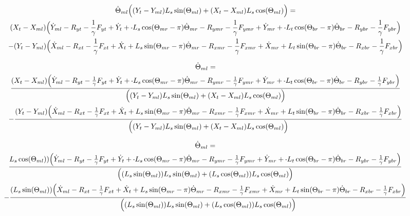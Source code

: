 \documentclass[11pt, landscape]{article}
\newcommand{\mn}{\scalebox{0.7}[1.0]{-}}
\begin{document}
\begin{multline}
\dot{\Theta}_{ml} \Big((Y_{t } - Y_{ml})L_{s}\sin(\Theta_{ml}) + (X_{t } - X_{ml})L_{s}\cos(\Theta_{ml}) \Big) = \\
(X_{t } - X_{ml}) \Big( \dot{Y}_{ml} - R_{yt} - \frac{1}{\gamma}F_{yt } + \dot{Y}_{t } + \mn L_{s}\cos(\Theta_{mr}-\pi)  \dot{\Theta}_{mr}
- R_{ymr} - \frac{1}{\gamma}F_{ymr} + \dot{Y}_{mr} + \mn L_{t}\cos(\Theta_{br}-\pi)  \dot{\Theta}_{br} - R_{ybr} - \frac{1}{\gamma}F_{ybr}\Big) \\
- (Y_{t } - Y_{ml})\Big( \dot{X}_{ml} - R_{xt } - \frac{1}{\gamma}F_{xt } + \dot{X}_{t } + L_{s}\sin(\Theta_{mr}-\pi)  \dot{\Theta}_{mr}
- R_{xmr} - \frac{1}{\gamma}F_{xmr} + \dot{X}_{mr} + L_{t}\sin(\Theta_{br}-\pi)  \dot{\Theta}_{br} - R_{xbr} - \frac{1}{\gamma}F_{xbr} \Big)
\end{multline}

\begin{multline}
\dot{\Theta}_{ml} = \\
\frac{(X_{t } - X_{ml}) \Big( \dot{Y}_{ml} - R_{yt} - \frac{1}{\gamma}F_{yt } + \dot{Y}_{t } + \mn L_{s}\cos(\Theta_{mr}-\pi)  \dot{\Theta}_{mr}
- R_{ymr} - \frac{1}{\gamma}F_{ymr} + \dot{Y}_{mr} + \mn L_{t}\cos(\Theta_{br}-\pi)  \dot{\Theta}_{br} - R_{ybr} - \frac{1}{\gamma}F_{ybr}\Big)}
{\Big((Y_{t } - Y_{ml})L_{s}\sin(\Theta_{ml}) + (X_{t } - X_{ml})L_{s}\cos(\Theta_{ml}) \Big)} \\
- \frac{(Y_{t } - Y_{ml})\Big( \dot{X}_{ml} - R_{xt } - \frac{1}{\gamma}F_{xt } + \dot{X}_{t } + L_{s}\sin(\Theta_{mr}-\pi)  \dot{\Theta}_{mr}
- R_{xmr} - \frac{1}{\gamma}F_{xmr} + \dot{X}_{mr} + L_{t}\sin(\Theta_{br}-\pi)  \dot{\Theta}_{br} - R_{xbr} - \frac{1}{\gamma}F_{xbr} \Big)}
{\Big((Y_{t } - Y_{ml})L_{s}\sin(\Theta_{ml}) + (X_{t } - X_{ml})L_{s}\cos(\Theta_{ml}) \Big)}
\end{multline}


\begin{multline}
\dot{\Theta}_{ml} = \\
\frac{L_{s}\cos(\Theta_{ml})) \Big( \dot{Y}_{ml} - R_{yt} - \frac{1}{\gamma}F_{yt } + \dot{Y}_{t } + \mn L_{s}\cos(\Theta_{mr}-\pi)  \dot{\Theta}_{mr}
- R_{ymr} - \frac{1}{\gamma}F_{ymr} + \dot{Y}_{mr} + \mn L_{t}\cos(\Theta_{br}-\pi)  \dot{\Theta}_{br} - R_{ybr} - \frac{1}{\gamma}F_{ybr}\Big)}
{\Big((L_{s}\sin(\Theta_{ml}))L_{s}\sin(\Theta_{ml}) + (L_{s}\cos(\Theta_{ml}))L_{s}\cos(\Theta_{ml}) \Big)} \\
- \frac{(L_{s}\sin(\Theta_{ml}))\Big( \dot{X}_{ml} - R_{xt } - \frac{1}{\gamma}F_{xt } + \dot{X}_{t } + L_{s}\sin(\Theta_{mr}-\pi)  \dot{\Theta}_{mr}
- R_{xmr} - \frac{1}{\gamma}F_{xmr} + \dot{X}_{mr} + L_{t}\sin(\Theta_{br}-\pi)  \dot{\Theta}_{br} - R_{xbr} - \frac{1}{\gamma}F_{xbr} \Big)}
{\Big((L_{s}\sin(\Theta_{ml}))L_{s}\sin(\Theta_{ml}) + (L_{s}\cos(\Theta_{ml}))L_{s}\cos(\Theta_{ml}) \Big)}
\end{multline}
\end{document}
